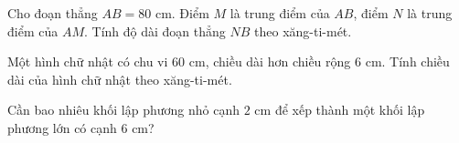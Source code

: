 \begin{ex} %
Cho đoạn thẳng $AB = 80\text{ cm}$. Điểm $M$ là trung điểm của $AB$, điểm $N$ là trung điểm của $AM$. Tính độ dài đoạn thẳng $NB$ theo xăng-ti-mét.
\end{ex}

\begin{ex} %
Một hình chữ nhật có chu vi $60\text{ cm}$, chiều dài hơn chiều rộng $6\text{ cm}$. Tính chiều dài của hình chữ nhật theo xăng-ti-mét.
\end{ex}

\begin{ex} %
Cần bao nhiêu khối lập phương nhỏ cạnh $2\text{ cm}$ để xếp thành một khối lập phương lớn có cạnh $6\text{ cm}$?
\end{ex}
